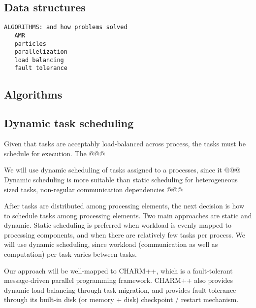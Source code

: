 \documentclass[14pt,letter]{article}
\begin{document}
\subsection{Data structures}

\begin{verbatim}
ALGORITHMS: and how problems solved
   AMR
   particles
   parallelization
   load balancing
   fault tolerance
\end{verbatim}


\subsection{Algorithms}

\subsection{Dynamic task scheduling}

Given that tasks are acceptably load-balanced across process, the
tasks must be schedule for execution.  The @@@


We will use dynamic scheduling of tasks assigned to a processes, since
it @@@  Dynamic scheduling is more suitable than static scheduling for
heterogeneous sized tasks, non-regular communication dependencies @@@


After tasks are distributed among processing elements, the next
decision is how to schedule tasks among processing elements.  Two main
approaches are static and dynamic.  Static scheduling is preferred
when workload is evenly mapped to processing components, and when
there are relatively few tasks per process.  We will use dynamic
scheduling, since workload (communication as well as computation) per
task varies between tasks.

Our approach will be well-mapped to CHARM++,
which is a fault-tolerant message-driven parallel programming
framework.  CHARM++ also provides dynamic load balancing through task
migration, and provides fault tolerance through its built-in disk (or
memory + disk) checkpoint / restart mechanism.
\end{document}
